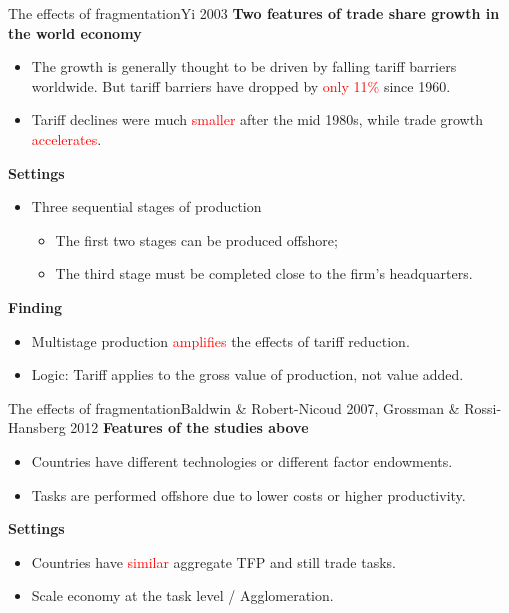 \documentclass{beamer}
\begin{document}
\begin{frame}{The effects of fragmentation}{Yi 2003}
	\textbf{Two features of trade share growth in the world economy}
	\begin{itemize}
		\item The growth is generally thought to be driven by falling tariff barriers worldwide. But tariff barriers have dropped by \textcolor{red}{only 11\%} since 1960.
		\item Tariff declines were much \textcolor{red}{smaller} after the mid 1980s, while trade growth \textcolor{red}{accelerates}.
	\end{itemize}
	\textbf{Settings}
	\begin{itemize}
		\item Three sequential stages of production
		\begin{itemize}
			\item The first two stages can be produced offshore;
			\item The third stage must be completed close to the firm's headquarters.
		\end{itemize}
	\end{itemize}
	\textbf{Finding}
	\begin{itemize}
		\item Multistage production \textcolor{red}{amplifies} the effects of tariff reduction.
		\item Logic: Tariff applies to the gross value of production, not value added.
	\end{itemize}
\end{frame}
\begin{frame}{The effects of fragmentation}{Baldwin \& Robert-Nicoud 2007, Grossman \& Rossi-Hansberg 2012}
	\textbf{Features of the studies above}
	\begin{itemize}
		\item Countries have different technologies or different factor endowments.
		\item Tasks are performed offshore due to lower costs or higher productivity.
	\end{itemize}
	\medskip
	\textbf{Settings}
	\begin{itemize}
		\item Countries have \textcolor{red}{similar} aggregate TFP and still trade tasks.
		\item Scale economy at the task level / Agglomeration.
	\end{itemize}
\end{frame}
\end{document}

